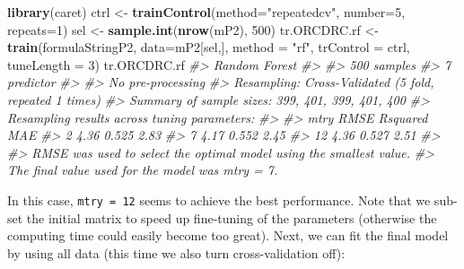 \documentclass[graybox,natbib,nospthms,UStrade]{svmono}
\newenvironment{Shaded}{\begin{snugshade}}{\end{snugshade}}
\newcommand{\CommentTok}[1]{\textcolor[rgb]{0.37,0.37,0.37}{\textit{#1}}}
\newcommand{\DataTypeTok}[1]{\textcolor[rgb]{0.27,0.27,0.27}{#1}}
\newcommand{\DecValTok}[1]{\textcolor[rgb]{0.06,0.06,0.06}{#1}}
\newcommand{\KeywordTok}[1]{\textcolor[rgb]{0.27,0.27,0.27}{\textbf{#1}}}
\newcommand{\NormalTok}[1]{#1}
\newcommand{\OperatorTok}[1]{\textcolor[rgb]{0.43,0.43,0.43}{\textbf{#1}}}
\newcommand{\StringTok}[1]{\textcolor[rgb]{0.5,0.5,0.5}{#1}}
\begin{document}
\begin{Shaded}
\begin{Highlighting}[]
\KeywordTok{library}\NormalTok{(caret)}
\NormalTok{ctrl <-}\StringTok{ }\KeywordTok{trainControl}\NormalTok{(}\DataTypeTok{method=}\StringTok{"repeatedcv"}\NormalTok{, }\DataTypeTok{number=}\DecValTok{5}\NormalTok{, }\DataTypeTok{repeats=}\DecValTok{1}\NormalTok{)}
\NormalTok{sel <-}\StringTok{ }\KeywordTok{sample.int}\NormalTok{(}\KeywordTok{nrow}\NormalTok{(mP2), }\DecValTok{500}\NormalTok{)}
\NormalTok{tr.ORCDRC.rf <-}\StringTok{ }\KeywordTok{train}\NormalTok{(formulaStringP2, }\DataTypeTok{data=}\NormalTok{mP2[sel,], }
                      \DataTypeTok{method =} \StringTok{"rf"}\NormalTok{, }\DataTypeTok{trControl =}\NormalTok{ ctrl, }\DataTypeTok{tuneLength =} \DecValTok{3}\NormalTok{)}
\NormalTok{tr.ORCDRC.rf}
\CommentTok{#> Random Forest }
\CommentTok{#> }
\CommentTok{#> 500 samples}
\CommentTok{#>   7 predictor}
\CommentTok{#> }
\CommentTok{#> No pre-processing}
\CommentTok{#> Resampling: Cross-Validated (5 fold, repeated 1 times) }
\CommentTok{#> Summary of sample sizes: 399, 401, 399, 401, 400 }
\CommentTok{#> Resampling results across tuning parameters:}
\CommentTok{#> }
\CommentTok{#>   mtry  RMSE  Rsquared  MAE }
\CommentTok{#>    2    4.36  0.525     2.83}
\CommentTok{#>    7    4.17  0.552     2.45}
\CommentTok{#>   12    4.36  0.527     2.51}
\CommentTok{#> }
\CommentTok{#> RMSE was used to select the optimal model using the smallest value.}
\CommentTok{#> The final value used for the model was mtry = 7.}
\end{Highlighting}
\end{Shaded}

In this case, \texttt{mtry\ =\ 12} seems to achieve the best performance. Note that we sub-set the initial matrix to speed up fine-tuning of the parameters (otherwise the computing time could easily become too great). Next, we can fit the final model by using all data (this time we also turn cross-validation off):

\begin{Shaded}
\end{Shaded}
\end{document}
